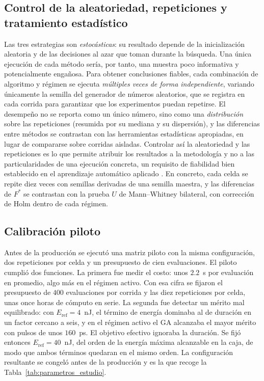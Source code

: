 \subsection{Control de la aleatoriedad, repeticiones y tratamiento estadístico}
\label{sec:aleatoriedad}

Las tres estrategias son \emph{estocásticas}: su resultado depende de la
inicialización aleatoria y de las decisiones al azar que toman durante la búsqueda.
Una única ejecución de cada método sería, por tanto, una muestra poco informativa y
potencialmente engañosa. Para obtener conclusiones fiables, cada combinación de
algoritmo y régimen se ejecuta \emph{múltiples veces de forma independiente},
variando únicamente la semilla del generador de números aleatorios, que se registra
en cada corrida para garantizar que los experimentos puedan repetirse. El desempeño
no se reporta como un único número, sino como una \emph{distribución} sobre las
repeticiones (resumida por su mediana y su dispersión), y las diferencias entre
métodos se contrastan con las herramientas estadísticas apropiadas, en lugar de
compararse sobre corridas aisladas. Controlar así la aleatoriedad y las repeticiones
es lo que permite atribuir los resultados a la metodología y no a las
particularidades de una ejecución concreta, un requisito de fiabilidad bien
establecido en el aprendizaje automático aplicado \cite{Pineau2021}. En concreto, cada
celda se repite diez veces con semillas derivadas de una semilla maestra, y las
diferencias de $F^\ast$ se contrastan con la prueba $U$ de Mann--Whitney bilateral,
con corrección de Holm dentro de cada régimen.

\subsection{Calibración piloto}
\label{sec:calibracion_piloto}

Antes de la producción se ejecutó una matriz piloto con la misma configuración, dos
repeticiones por celda y un presupuesto de cien evaluaciones. El piloto cumplió dos
funciones. La primera fue medir el costo: unos $2.2$~s por evaluación en promedio,
algo más en el régimen activo. Con esa cifra se fijaron el presupuesto de $400$
evaluaciones por corrida y las diez repeticiones por celda, unas once horas de cómputo
en serie. La segunda fue detectar un mérito mal equilibrado: con $E_{\mathrm{ref}}=4$~nJ,
el término de energía dominaba al de duración en un factor cercano a seis, y en el
régimen activo el GA alcanzaba el mayor mérito con pulsos de unos $160$~ps. El objetivo
efectivo ignoraba la duración. Se fijó entonces $E_{\mathrm{ref}}=40$~nJ, del orden de la
energía máxima alcanzable en la caja, de modo que ambos términos quedaran en el mismo
orden. La configuración resultante se congeló antes de la producción y es la que recoge
la Tabla~\ref{tab:parametros_estudio}.

